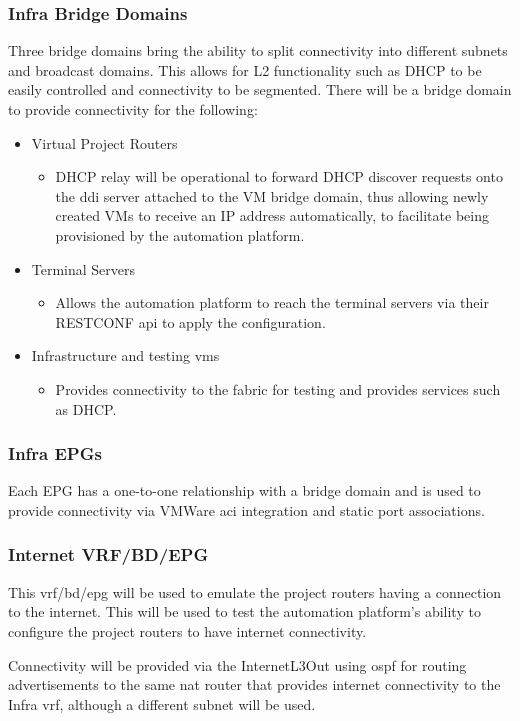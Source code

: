 \subsubsection{Infra Bridge Domains}
Three bridge domains bring the ability to split connectivity into different subnets and broadcast domains. This allows for L2 functionality such as DHCP to be easily controlled and connectivity to be segmented. There will be a bridge domain to provide connectivity for the following:
\begin{itemize}
    \item Virtual Project Routers
    \begin{itemize}
        \item DHCP relay will be operational to forward DHCP discover requests onto the \gls{ddi} server attached to the VM bridge domain, thus allowing newly created VMs to receive an IP address automatically, to facilitate being provisioned by the automation platform.
    \end{itemize}
    \item Terminal Servers
    \begin{itemize}
        \item Allows the automation platform to reach the terminal servers via their RESTCONF \gls{api} to apply the configuration.
    \end{itemize}
    \item Infrastructure and testing \gls{vm}s
    \begin{itemize}
        \item Provides connectivity to the fabric for testing and provides services such as DHCP.
    \end{itemize}
\end{itemize}

\subsubsection{Infra EPGs}
Each EPG has a one-to-one relationship with a bridge domain and is used to provide connectivity via VMWare \gls{aci} integration and static port associations.

\subsubsection{Internet VRF/BD/EPG}
This \gls{vrf}/\gls{bd}/\gls{epg} will be used to emulate the project routers having a connection to the internet. This will be used to test the automation platform's ability to configure the project routers to have internet connectivity.

Connectivity will be provided via the InternetL3Out using \gls{ospf} for routing advertisements to the same \gls{nat} router that provides internet connectivity to the Infra \gls{vrf}, although a different subnet will be used.
